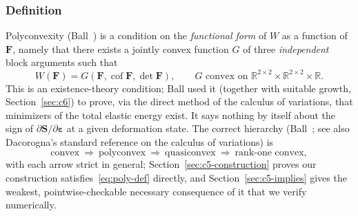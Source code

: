 \documentclass[10pt,a4paper]{article}
\newcommand{\Cof}{\operatorname{cof}}
\newcommand{\R}{\mathbb{R}}
\begin{document}
\subsubsection{Definition}
\label{sec:c5-definition}
Polyconvexity (Ball~\cite{Ball1977}) is a condition on the
\emph{functional form} of $W$ as a function of $\bm F$, namely that there
exists a jointly convex function $G$ of three \emph{independent} block
arguments such that
\begin{equation}
 W(\bm F)=G(\bm F,\Cof \bm F,\det \bm F),\qquad G\text{ convex on }\R^{2\times2}
 \times\R^{2\times2}\times\R.
 \label{eq:poly-def}
\end{equation}
This is an existence-theory condition; Ball used it (together with
suitable growth, Section~\ref{sec:c6}) to prove, via the direct method of
the calculus of variations, that minimizers of the total elastic energy
exist. It says nothing by itself about the sign of $\partial\bm S/
\partial\bm\varepsilon$ at a given deformation state. The correct
hierarchy (Ball~\cite{Ball1977}; see also Dacorogna's standard reference
on the calculus of variations) is
\begin{equation}
 \text{convex}\ \Longrightarrow\ \text{polyconvex}\ \Longrightarrow\
 \text{quasiconvex}\ \Longrightarrow\ \text{rank-one convex},
 \label{eq:hierarchy}
\end{equation}
with each arrow strict in general; Section~\ref{sec:c5-construction}
proves our construction satisfies~\eqref{eq:poly-def} directly, and
Section~\ref{sec:c5-implies} gives the weakest, pointwise-checkable
necessary consequence of it that we verify numerically.
\end{document}
